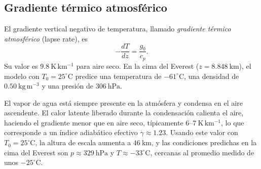\subsection{Gradiente térmico atmosférico}

El gradiente vertical negativo de temperatura, llamado \emph{gradiente térmico atmosférico} (lapse rate), es
$$ -\frac{dT}{dz} = \frac{g_0}{c_p}. $$
Su valor es $9.8\ \mathrm{K\,km^{-1}}$ para aire seco. En la cima del Everest ($z = 8.848\ \mathrm{km}$), el modelo con $T_0 = 25^\circ\mathrm{C}$ predice una temperatura de $-61^\circ\mathrm{C}$, una densidad de $0.50\ \mathrm{kg\,m^{-3}}$ y una presión de $306\ \mathrm{hPa}$.

El vapor de agua está siempre presente en la atmósfera y condensa en el aire ascendente. El calor latente liberado durante la condensación calienta el aire, haciendo el gradiente menor que en aire seco, típicamente $6$--$7\ \mathrm{K\,km^{-1}}$, lo que corresponde a un índice adiabático efectivo $\gamma \approx 1.23$. Usando este valor con $T_0 = 25^\circ\mathrm{C}$, la altura de escala aumenta a $46\ \mathrm{km}$, y las condiciones predichas en la cima del Everest son $p \approx 329\ \mathrm{hPa}$ y $T \approx -33^\circ\mathrm{C}$, cercanas al promedio medido de unos $-25^\circ\mathrm{C}$.

\figuraModelosAtmosfericos